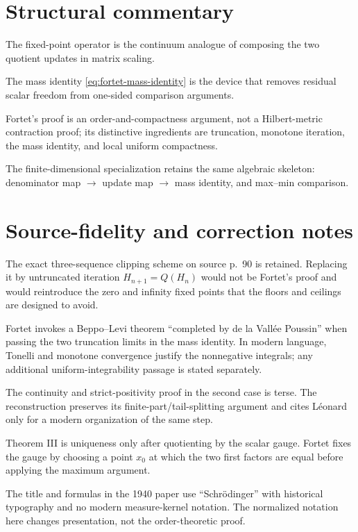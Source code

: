 \section{Structural commentary}
\begin{commentarynotes}
\item The fixed-point operator is the continuum analogue of composing the two quotient updates in matrix scaling.
\item The mass identity \eqref{eq:fortet-mass-identity} is the device that removes residual scalar freedom from one-sided comparison arguments.
\item Fortet's proof is an order-and-compactness argument, not a Hilbert-metric contraction proof; its distinctive ingredients are truncation, monotone iteration, the mass identity, and local uniform compactness.
\item The finite-dimensional specialization retains the same algebraic skeleton: denominator map $\to$ update map $\to$ mass identity, and max--min comparison.
\end{commentarynotes}

\section{Source-fidelity and correction notes}
\begin{commentarynotes}
\item The exact three-sequence clipping scheme on source p.~90 is retained.
Replacing it by untruncated iteration $H_{n+1}=Q(H_n)$ would not be Fortet's
proof and would reintroduce the zero and infinity fixed points that the floors
and ceilings are designed to avoid.
\item Fortet invokes a Beppo--Levi theorem ``completed by de la Vall\'ee
Poussin'' when passing the two truncation limits in the mass identity.  In
modern language, Tonelli and monotone convergence justify the nonnegative
integrals; any additional uniform-integrability passage is stated separately.
\item The continuity and strict-positivity proof in the second case is terse.
The reconstruction preserves its finite-part/tail-splitting argument and cites
L\'eonard only for a modern organization of the same step.
\item Theorem III is uniqueness only after quotienting by the scalar gauge.
Fortet fixes the gauge by choosing a point $x_0$ at which the two first factors
are equal before applying the maximum argument.
\item The title and formulas in the 1940 paper use ``Schr\"odinger'' with
historical typography and no modern measure-kernel notation.  The normalized
notation here changes presentation, not the order-theoretic proof.
\end{commentarynotes}

